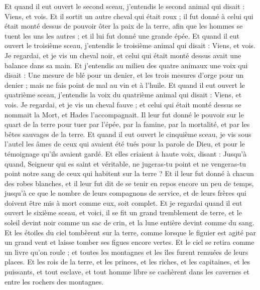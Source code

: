 \begin{multicols}{2}
Et quand il eut ouvert le second sceau, j'entendis le second animal qui disait : Viens, et vois.
Et il sortit un autre cheval qui était roux ; il fut donné à celui qui était monté dessus de pouvoir ôter la paix de la terre, afin que les hommes se tuent les uns les autres ; et il lui fut donné une grande épée.
Et quand il eut ouvert le troisième sceau, j'entendis le troisième animal qui disait : Viens, et vois. Je regardai, et je vis un cheval noir, et celui qui était monté dessus avait une balance dans sa main.
Et j'entendis au milieu des quatre animaux une voix qui disait : Une mesure de blé pour un denier, et les trois mesures d'orge pour un denier ; mais ne fais point de mal au vin et à l'huile.
Et quand il eut ouvert le quatrième sceau, j'entendis la voix du quatrième animal qui disait : Viens, et vois.
Je regardai, et je vis un cheval fauve ; et celui qui était monté dessus se nommait la Mort, et Hades l'accompagnait. Il leur fut donné le pouvoir sur le quart de la terre pour tuer par l'épée, par la famine, par la mortalité, et par les bêtes sauvages de la terre.
Et quand il eut ouvert le cinquième sceau, je vis sous l'autel les âmes de ceux qui avaient été tués pour la parole de Dieu, et pour le témoignage qu'ils avaient gardé.
Et elles criaient à haute voix, disant : Jusqu'à quand, Seigneur qui es saint et véritable, ne jugeras-tu point et ne vengeras-tu point notre sang de ceux qui habitent sur la terre ?
Et il leur fut donné à chacun des robes blanches, et il leur fut dit de se tenir en repos encore un peu de temps, jusqu'à ce que le nombre de leurs compagnons de service, et de leurs frères qui doivent être mis à mort comme eux, soit complet.
Et je regardai quand il eut ouvert le sixième sceau, et voici, il se fit un grand tremblement de terre, et le soleil devint noir comme un sac de crin, et la lune entière devint comme du sang.
Et les étoiles du ciel tombèrent sur la terre, comme lorsque le figuier est agité par un grand vent et laisse tomber ses figues encore vertes.
Et le ciel se retira comme un livre qu'on roule ; et toutes les montagnes et les îles furent remuées de leurs places.
Et les rois de la terre, et les princes, et les riches, et les capitaines, et les puissants, et tout esclave, et tout homme libre se cachèrent dans les cavernes et entre les rochers des montagnes.

\end{multicols}
